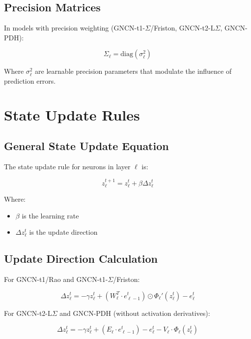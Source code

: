 \documentclass{article}
\begin{document}
\subsection{Precision Matrices}

In models with precision weighting (GNCN-t1-$\Sigma$/Friston, GNCN-t2-L$\Sigma$, GNCN-PDH):

\begin{equation}
  \Sigma_\ell = \text{diag}(\sigma_\ell^2)
\end{equation}

Where $\sigma_\ell^2$ are learnable precision parameters that modulate the influence of prediction errors.

\section{State Update Rules}

\subsection{General State Update Equation}

The state update rule for neurons in layer $\ell$ is:

\begin{equation}
  z_\ell^{t+1} = z_\ell^t + \beta \Delta z_\ell^t
\end{equation}

Where:
\begin{itemize}
  \item $\beta$ is the learning rate
  \item $\Delta z_\ell^t$ is the update direction
\end{itemize}

\subsection{Update Direction Calculation}

For GNCN-t1/Rao and GNCN-t1-$\Sigma$/Friston:

\begin{equation}
  \Delta z_\ell^t = -\gamma z_\ell^t + (W_\ell^T \cdot e_{\ell-1}^t) \odot \Phi_\ell'(z_\ell^t) - e_\ell^t
\end{equation}

For GNCN-t2-L$\Sigma$ and GNCN-PDH (without activation derivatives):

\begin{equation}
  \Delta z_\ell^t = -\gamma z_\ell^t + (E_\ell \cdot e_{\ell-1}^t) - e_\ell^t - V_\ell \cdot \Phi_\ell(z_\ell^t)
\end{equation}
\end{document}
